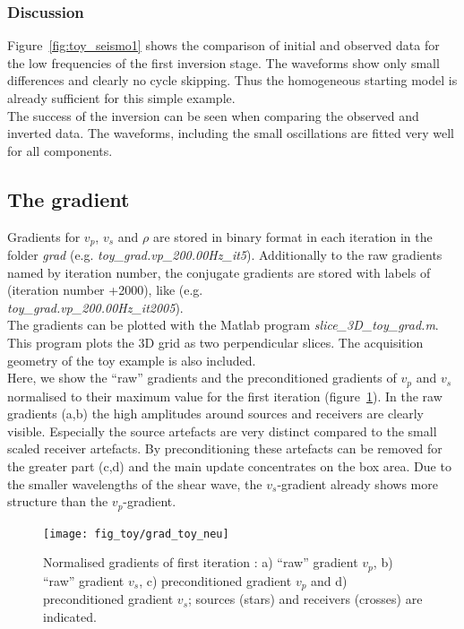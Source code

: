 \subsubsection*{Discussion}
Figure~\ref{fig:toy_seismo1} shows the comparison of initial and observed data for the low frequencies of the first inversion stage. The waveforms show only small differences and clearly no cycle skipping. Thus the homogeneous starting model is already sufficient for this simple example. \\
The success of the inversion can be seen when comparing the observed and inverted data. The waveforms, including the small oscillations are fitted very well for all components.
\subsection{The gradient} 
Gradients for $v_p$, $v_s$ and $\rho$ are stored in binary format in each iteration in the folder \textit{grad} (e.g. \textit{toy\_grad.vp\_200.00Hz\_it5}). Additionally to the raw gradients named by iteration number, the conjugate gradients are stored with labels of (iteration number +2000), like  (e.g. \\ \textit{toy\_grad.vp\_200.00Hz\_it2005}). \\
The gradients can be plotted with the Matlab program \textit{slice\_3D\_toy\_grad.m}. This program plots the 3D grid as two perpendicular slices. The acquisition geometry of the toy example is also included. \\
Here, we show the ``raw'' gradients and the preconditioned gradients of $v_p$ and $v_s$ normalised to their maximum value for the first iteration (figure~\ref{fig:toy_grad}). In the raw gradients (a,b) the high amplitudes around sources and receivers are clearly visible. Especially the source artefacts are very distinct compared to the small scaled receiver artefacts. By preconditioning these artefacts can be removed for the greater part (c,d) and the main update concentrates on the box area. Due to the smaller wavelengths of the shear wave, the $v_s$-gradient already shows more structure than the $v_p$-gradient. 
\begin{figure}[h!]
\begin{center}
\texttt{[image: fig\_toy/grad\_toy\_neu]}
\caption[Toy example - gradient before and after preconditioning]{Normalised gradients of first iteration : a) ``raw'' gradient $v_p$, b) ``raw'' gradient $v_s$, c) preconditioned gradient $v_p$ and d) preconditioned gradient $v_s$; sources (stars) and receivers (crosses) are indicated. }\label{fig:toy_grad}
\end{center}
\end{figure}
